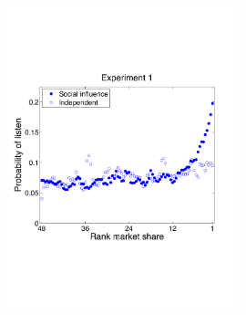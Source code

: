 \documentclass[aspectratio=169]{beamer}
\begin{document}
%
%
%
\begin{frame}

\begin{figure}
  \centering
  \includegraphics[width= 0.6\textwidth]{figures/listenchoice_v1_smoothed_1}
\end{figure}

\end{frame}
\end{document}
